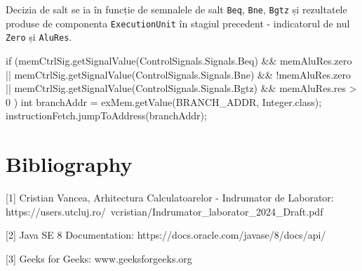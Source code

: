 \documentclass{article}
\begin{document}
Decizia de salt se ia în funcție de semnalele de salt \texttt{Beq}, \texttt{Bne}, \texttt{Bgtz} și rezultatele produse de componenta \texttt{ExecutionUnit} în stagiul precedent - indicatorul de nul \texttt{Zero} și \texttt{AluRes}.

\begin{javacodebox}
if (memCtrlSig.getSignalValue(ControlSignals.Signals.Beq) && memAluRes.zero ||
    memCtrlSig.getSignalValue(ControlSignals.Signals.Bne) && !memAluRes.zero ||
    memCtrlSig.getSignalValue(ControlSignals.Signals.Bgtz) && memAluRes.res > 0
) {
    int branchAddr = exMem.getValue(BRANCH_ADDR, Integer.class);
    instructionFetch.jumpToAddress(branchAddr);
}
\end{javacodebox}

\par{}

\newpage
\section{Bibliography}
[1] Cristian Vancea, Arhitectura Calculatoarelor - Indrumator de Laborator: https://users.utcluj.ro/~vcristian/Indrumator\_laborator\_2024\_Draft.pdf

[2] Java SE 8 Documentation: https://docs.oracle.com/javase/8/docs/api/

[3] Geeks for Geeks: www.geeksforgeeks.org
 
\end{document}
